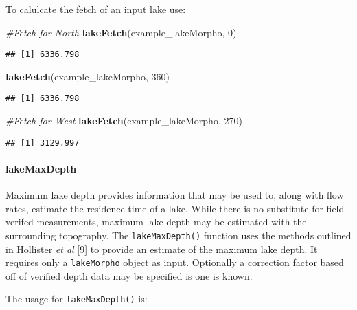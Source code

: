 \documentclass[11pt,]{article}
\newenvironment{Shaded}{\begin{snugshade}}{\end{snugshade}}
\newcommand{\KeywordTok}[1]{\textcolor[rgb]{0.13,0.29,0.53}{\textbf{{#1}}}}
\newcommand{\DecValTok}[1]{\textcolor[rgb]{0.00,0.00,0.81}{{#1}}}
\newcommand{\CommentTok}[1]{\textcolor[rgb]{0.56,0.35,0.01}{\textit{{#1}}}}
\newcommand{\NormalTok}[1]{{#1}}
\begin{document}
To calulcate the fetch of an input lake use:

\begin{Shaded}
\begin{Highlighting}[]
\CommentTok{#Fetch for North}
\KeywordTok{lakeFetch}\NormalTok{(example_lakeMorpho, }\DecValTok{0}\NormalTok{)}
\end{Highlighting}
\end{Shaded}

\begin{verbatim}
## [1] 6336.798
\end{verbatim}

\begin{Shaded}
\begin{Highlighting}[]
\KeywordTok{lakeFetch}\NormalTok{(example_lakeMorpho, }\DecValTok{360}\NormalTok{)}
\end{Highlighting}
\end{Shaded}

\begin{verbatim}
## [1] 6336.798
\end{verbatim}

\begin{Shaded}
\begin{Highlighting}[]
\CommentTok{#Fetch for West}
\KeywordTok{lakeFetch}\NormalTok{(example_lakeMorpho, }\DecValTok{270}\NormalTok{)}
\end{Highlighting}
\end{Shaded}

\begin{verbatim}
## [1] 3129.997
\end{verbatim}

\paragraph{lakeMaxDepth}\label{lakemaxdepth}

Maximum lake depth provides information that may be used to, along with
flow rates, estimate the residence time of a lake. While there is no
substitute for field verifed measurements, maximum lake depth may be
estimated with the surrounding topography. The \texttt{lakeMaxDepth()}
function uses the methods outlined in Hollister \emph{et al} {[}9{]} to
provide an estimate of the maximum lake depth. It requires only a
\texttt{lakeMorpho} object as input. Optionally a correction factor
based off of verified depth data may be specified is one is known.

The usage for \texttt{lakeMaxDepth()} is:
\end{document}
